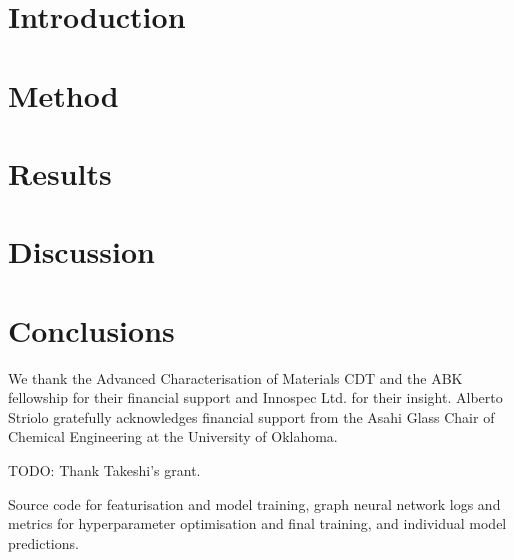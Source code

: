 \documentclass[journal=jcisd8,manuscript=article]{achemso}
\begin{document}
\section{Introduction}



\section{Method}



\section{Results}



\section{Discussion}



\section{Conclusions}



\begin{acknowledgement}
We thank the Advanced Characterisation of Materials CDT and the ABK fellowship
for their financial support and Innospec Ltd. for their insight. Alberto Striolo
gratefully acknowledges financial support from the Asahi Glass Chair of Chemical
Engineering at the University of Oklahoma.

TODO: Thank Takeshi's grant.
\end{acknowledgement}

\begin{suppinfo}

    Source code for featurisation and model training, graph neural network logs
    and metrics for hyperparameter optimisation and final training, and
    individual model predictions.

\end{suppinfo}
\end{document}
